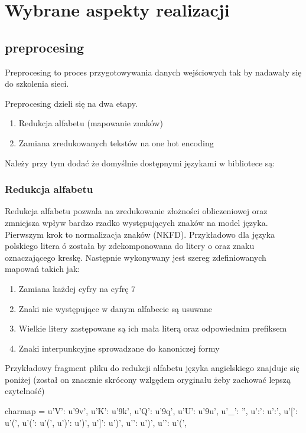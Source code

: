 \newpage
\section{Wybrane aspekty realizacji}

\subsection{preprocesing}
Preprocesing to proces przygotowywania danych wejściowych tak by nadawały się do szkolenia sieci.

Preprocesing dzieli się na dwa etapy.
\begin{enumerate}
	\item Redukcja alfabetu (mapowanie znaków)
	\item Zamiana zredukowanych tekstów na one hot encoding
\end{enumerate}

Należy przy tym dodać że domyślnie dostępnymi językami w bibliotece są:
\languages 
 

\subsubsection{Redukcja alfabetu}
Redukcja alfabetu pozwala na zredukowanie złożności obliczeniowej oraz zmniejsza wpływ bardzo rzadko
występujących znaków na model języka. Pierwszym krok to normalizacja znaków (NKFD). Przykładowo dla
języka polskiego litera ó została by zdekomponowana do litery o oraz znaku oznaczającego kreskę.
Następnie wykonywany jest szereg zdefiniowanych mapowań takich jak:
\begin{enumerate}
  \item Zamiana każdej cyfry na cyfrę 7
  \item Znaki nie występujące w danym alfabecie są usuwane
  \item Wielkie litery zastępowane są ich mała literą oraz odpowiednim prefiksem
  \item Znaki interpunkcyjne sprowadzane do kanoniczej formy
\end{enumerate}
\newpage
Przykładowy fragment pliku do redukcji alfabetu języka
angielskiego znajduje się poniżej (został on znacznie skrócony wzlgędem oryginału żeby zachować lepszą
czytelność)

\begin{python}
charmap = {
    u'V': u'\xb9v',     
    u'K': u'\xb9k',         
    u'Q': u'\xb9q',        
    u'U': u'\xb9u',   
    u'_': '',             
    u':': u':',             
    u'[': u'(',           
    u'(': u'(',               
    u')': u')',              
    u']': u')',              
    u'}': u')',              
    u'{': u'(',                 
}
\end{python}

